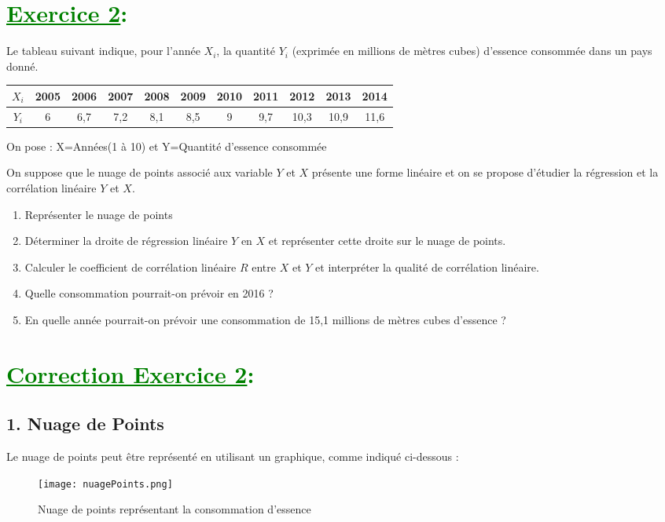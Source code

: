 \documentclass[12pt]{article}
\begin{document}
\section*{\textcolor{green}{\underline{Exercice 2}:}}

Le tableau suivant indique, pour l'année \(X_i\), la quantité \(Y_i\) (exprimée en millions de mètres cubes) d'essence consommée dans un pays donné.

\begin{tabular}{|c|c|c|c|c|c|c|c|c|c|c|}
  \hline
  $X_{i}$ & 2005 & 2006 & 2007 & 2008 & 2009 & 2010 & 2011 & 2012 & 2013 & 2014 \\
  \hline
  $Y_{i}$ & 6 & 6,7 & 7,2 & 8,1 & 8,5 & 9 & 9,7 & 10,3 & 10,9 & 11,6 \\
  \hline
\end{tabular}

On pose : X=Années(1 à 10) et Y=Quantité d'essence consommée

On suppose que le nuage de points associé aux variable \(Y\) et \(X\) présente une forme linéaire et on se propose d'étudier la régression et la corrélation linéaire \(Y\) et \(X\).
\begin{enumerate}
  \item Représenter le nuage de points
  \item Déterminer la droite de régression linéaire \(Y\) en \(X\) et représenter cette droite sur le nuage de points.
  \item Calculer le coefficient de corrélation linéaire \(R\) entre \(X\) et \(Y\) et interpréter la qualité de corrélation linéaire.
  \item Quelle consommation pourrait-on prévoir en 2016 ?
  \item En quelle année pourrait-on prévoir une consommation de 15,1 millions de mètres cubes d'essence ?
\end{enumerate}
\section*{\textcolor{green}{\underline{Correction Exercice 2}:}}

\subsection*{1. Nuage de Points}
Le nuage de points peut être représenté en utilisant un graphique, comme indiqué ci-dessous :
\newpage
\begin{figure}[h]
    \centering
   \texttt{[image: nuagePoints.png]} %
    \caption{Nuage de points représentant la consommation d'essence}
    \label{fig:nuage_points}
\end{figure}
\end{document}

